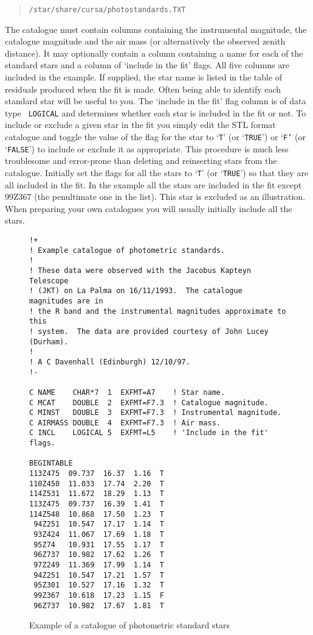 \documentclass[twoside,11pt]{article}
\renewcommand{\_}{\texttt{\symbol{95}}}
\begin{document}
\begin{verse}
{\tt /star/share/cursa/photostandards.TXT}
\end{verse}

The catalogue must contain columns containing the instrumental magnitude,
the catalogue magnitude and the air mass (or alternatively the observed
zenith distance).  It may optionally contain a column containing a name
for each of the standard stars and a column of `include in the fit'
flags.  All five columns are included in the example.  If supplied, the
star name is listed in the table of residuals produced when the fit is
made.  Often being able to identify each standard star will be useful
to you.  The `include in the fit' flag column is of data type {\tt
LOGICAL} and determines whether each star is included in the fit or
not.  To include or exclude a given star in the fit you simply edit
the STL format catalogue and toggle the value of the flag for the
star to `{\tt T}' (or `{\tt TRUE}') or `{\tt F'} (or `{\tt FALSE}') to
include or exclude it as appropriate.  This procedure is much less
troublesome and error-prone than deleting and reinserting stars from
the catalogue.  Initially set the flags for all the stars to `{\tt T}'
(or `{\tt TRUE}') so that they are all included in the fit.  In the
example all the stars are included in the fit except 99Z367 (the
penultimate one in the list).  This star is excluded as an illustration.
When preparing your own catalogues you will usually initially include all
the stars.

\begin{figure}[htbp]

\begin{verbatim}
!+
! Example catalogue of photometric standards.
!
! These data were observed with the Jacobus Kapteyn Telescope
! (JKT) on La Palma on 16/11/1993.  The catalogue magnitudes are in
! the R band and the instrumental magnitudes approximate to this
! system.  The data are provided courtesy of John Lucey (Durham).
!
! A C Davenhall (Edinburgh) 12/10/97.
!-

C NAME    CHAR*7  1  EXFMT=A7    ! Star name.
C MCAT    DOUBLE  2  EXFMT=F7.3  ! Catalogue magnitude.
C MINST   DOUBLE  3  EXFMT=F7.3  ! Instrumental magnitude.
C AIRMASS DOUBLE  4  EXFMT=F7.3  ! Air mass.
C INCL    LOGICAL 5  EXFMT=L5    ! 'Include in the fit' flags.

BEGINTABLE
113Z475  09.737  16.37  1.16  T
110Z450  11.033  17.74  2.20  T
114Z531  11.672  18.29  1.13  T
113Z475  09.737  16.39  1.41  T
114Z548  10.868  17.50  1.23  T
 94Z251  10.547  17.17  1.14  T
 93Z424  11.067  17.69  1.18  T
 95Z74   10.931  17.55  1.17  T
 96Z737  10.982  17.62  1.26  T
 97Z249  11.369  17.99  1.14  T
 94Z251  10.547  17.21  1.57  T
 95Z301  10.527  17.16  1.32  T
 99Z367  10.618  17.23  1.15  F
 96Z737  10.982  17.67  1.81  T
\end{verbatim}

\caption{Example of a catalogue of photometric standard stars
\label{PHOTOSTDCAT} }

\end{figure}
\end{document}

